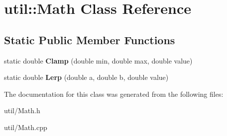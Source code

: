 \hypertarget{classutil_1_1Math}{}\section{util\+:\+:Math Class Reference}
\label{classutil_1_1Math}
\subsection*{Static Public Member Functions}
\begin{DoxyCompactItemize}
\item 
static double {\bfseries Clamp} (double min, double max, double value)\hypertarget{classutil_1_1Math_a24cd8c79d92406bc0acb55c52777f52a}{}\label{classutil_1_1Math_a24cd8c79d92406bc0acb55c52777f52a}

\item 
static double {\bfseries Lerp} (double a, double b, double value)\hypertarget{classutil_1_1Math_aef88219126568ad4b44a4a5f1ea39e58}{}\label{classutil_1_1Math_aef88219126568ad4b44a4a5f1ea39e58}

\end{DoxyCompactItemize}


The documentation for this class was generated from the following files\+:\begin{DoxyCompactItemize}
\item 
util/Math.\+h\item 
util/Math.\+cpp\end{DoxyCompactItemize}
